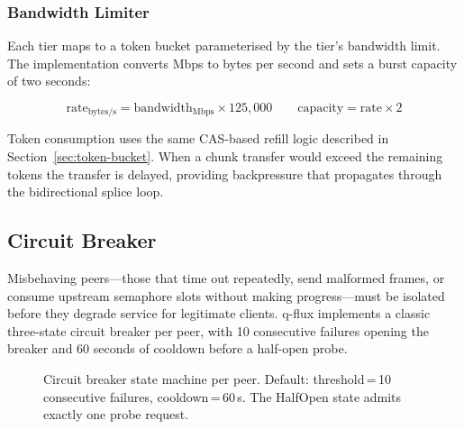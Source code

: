 \documentclass[a4paper, 11pt]{article}
\begin{document}
\subsubsection{Bandwidth Limiter}

Each tier maps to a token bucket parameterised by the tier's bandwidth
limit. The implementation converts Mbps to bytes per second and sets a
burst capacity of two seconds:

\begin{equation}
\text{rate}_{\text{bytes/s}} = \text{bandwidth}_{\text{Mbps}} \times 125{,}000
\qquad
\text{capacity} = \text{rate} \times 2
\end{equation}

Token consumption uses the same CAS-based refill logic described in
Section~\ref{sec:token-bucket}. When a chunk transfer would exceed the
remaining tokens the transfer is delayed, providing backpressure that
propagates through the bidirectional splice loop.

\subsection{Circuit Breaker}
\label{sec:circuit-breaker}

Misbehaving peers---those that time out repeatedly, send malformed
frames, or consume upstream semaphore slots without making
progress---must be isolated before they degrade service for legitimate
clients. q-flux implements a classic three-state circuit breaker per
peer, with 10 consecutive failures opening the breaker and 60 seconds
of cooldown before a half-open probe.

\begin{figure}[t]
\centering
{}
\caption{Circuit breaker state machine per peer.
  Default: threshold\,=\,10 consecutive failures,
  cooldown\,=\,60\,s. The HalfOpen state admits exactly one probe
  request.}
\label{fig:circuit-breaker}
\end{figure}
\end{document}
